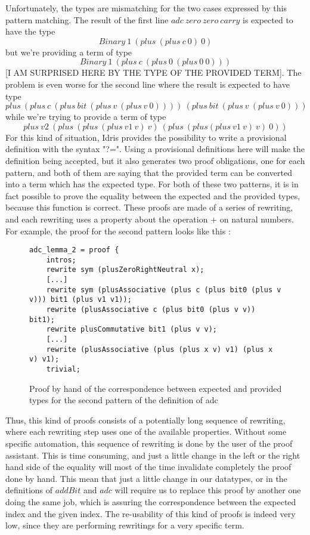 Unfortunately, the types are mismatching for the two cases expressed by this pattern matching. The result of the first line $adc\ zero\ zero\ carry$ is expected to have the type\[Binary\ 1\ (plus\ (plus\ c\ 0)\ 0)\] but we're providing a term of type \[Binary\ 1\ (plus\ c\ (plus\ 0\ (plus\ 0\ 0)))\] [I AM SURPRISED HERE BY THE TYPE OF THE PROVIDED TERM].
The problem is even worse for the second line where the result is expected to have type \[plus\ (plus\ c\ (plus\ bit\ (plus\ v\ (plus\ v\ 0))))\ (plus\ bit\ (plus\ v\ (plus\ v\ 0)))\] while we're trying to provide a term of type \[plus\ v2\ (plus\ (plus\ (plus\ v1\ v)\ v)\ (plus\ (plus (plus\ v1\ v)\ v)\ 0))\]
For this kind of situation, Idris provides the possibility to write a provisional definition with the syntax "?=". Using a provisional definitions here will make the definition being accepted, but it also generates two proof obligations, one for each pattern, and both of them are saying that the provided term can be converted into a term which has the expected type.
For both of these two patterns, it is in fact possible to prove the equality between the expected and the provided types, because this function is correct. These proofs are made of a series of rewriting, and each rewriting uses a property about the operation $+$ on natural numbers.
For example, the proof for the second pattern looks like this :
\begin{figure}[H]
\figrule
\begin{center}
\begin{lstlisting}
adc_lemma_2 = proof {
    intros;
    rewrite sym (plusZeroRightNeutral x);
    [...]
    rewrite sym (plusAssociative (plus c (plus bit0 (plus v v))) bit1 (plus v1 v1));
    rewrite (plusAssociative c (plus bit0 (plus v v)) bit1);
    rewrite plusCommutative bit1 (plus v v);
    [...]
    rewrite (plusAssociative (plus (plus x v) v1) (plus x v) v1);
    trivial;
\end{lstlisting}
\end{center}
\caption{Proof by hand of the correspondence between expected and provided types for the second pattern of the definition of adc}
\figrule
\end{figure}


Thus, this kind of proofs consists of a potentially long sequence of rewriting, where each rewriting step uses one of the available properties. Without some specific automation, this sequence of rewriting is done by the user of the proof assistant. This is time consuming, and just a little change in the left or the right hand side of the equality will most of the time invalidate completely the proof done by hand. This mean that just a little change in our datatypes, or in the definitions of $addBit$ and $adc$ will require us to replace this proof by another one doing the same job, which is assuring the correspondence between the expected index and the given index. The re-usability of this kind of proofs is indeed very low, since they are performing rewritings for a very specific term.

